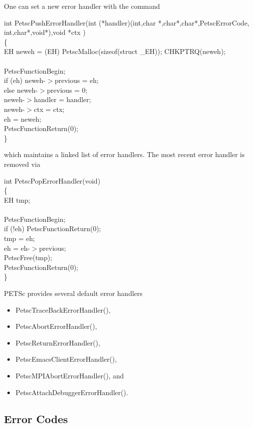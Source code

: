 \documentclass[twoside,12pt]{../sty/report_petsc}
\begin{document}
One can set a new error handler with the command 
\begin{tabbing}
int PetscPushErrorHandler(int (*handler)(int,char *,char*,char*,PetscErrorCode,\\
                          int,char*,void*),void *ctx )\\
\{\\
  EH neweh = (EH) PetscMalloc(sizeof(struct \_EH)); CHKPTRQ(neweh);\\
\\
  PetscFunctionBegin;\\
  if (eh) {neweh-$>$previous = eh;} \\
  else    {neweh-$>$previous = 0;}\\
  neweh-$>$handler = handler;\\
  neweh-$>$ctx     = ctx;\\
  eh             = neweh;\\
  PetscFunctionReturn(0);\\
\}
\end{tabbing}
which maintains a linked list of error handlers. The most recent error handler is removed
via
\begin{tabbing}
int PetscPopErrorHandler(void)\\
\{\\
  EH tmp;\\
\\
  PetscFunctionBegin;\\
  if (!eh) PetscFunctionReturn(0);\\
  tmp = eh;\\
  eh  = eh-$>$previous;\\
  PetscFree(tmp);\\
  PetscFunctionReturn(0);\\
\}
\end{tabbing}

PETSc provides several default error handlers
\begin{itemize}
\item PetscTraceBackErrorHandler(),
\item PetscAbortErrorHandler(), 
\item PetscReturnErrorHandler(), 
\item PetscEmacsClientErrorHandler(), 
\item PetscMPIAbortErrorHandler(), and
\item PetscAttachDebuggerErrorHandler(). 
\end{itemize}

\subsection{Error Codes}
\end{document}
